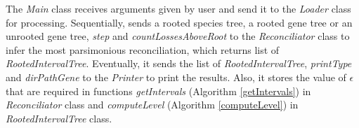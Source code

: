 The \emph{Main} class receives arguments given by user and send it to the \emph{Loader} class for processing. Sequentially, sends a rooted species tree, a rooted gene tree or an unrooted gene tree, \emph{step} and \emph{countLossesAboveRoot} to the \emph{Reconciliator} class to infer the most parsimonious reconciliation, which returns list of \emph{RootedIntervalTree}. Eventually, it sends the list of \emph{RootedIntervalTree}, \emph{printType} and \emph{dirPathGene} to the \emph{Printer} to print the results. Also, it stores the value of $\epsilon$ that are required in functions \emph{getIntervals} (Algorithm \ref{getIntervals}) in \emph{Reconciliator} class and \emph{computeLevel} (Algorithm \ref{computeLevel}) in \emph{RootedIntervalTree} class.  \\
